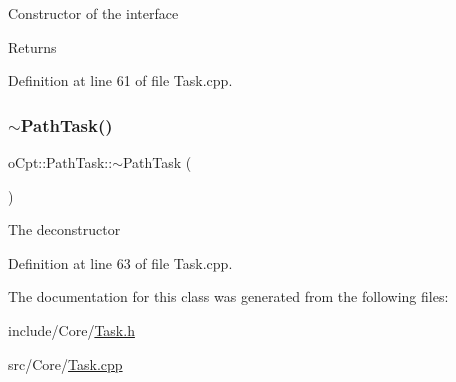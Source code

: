 Constructor of the interface \begin{DoxyReturn}{Returns}

\end{DoxyReturn}


Definition at line 61 of file Task.\+cpp.

\hypertarget{classo_cpt_1_1_path_task_a957810982a8f94b7c0b942e348e86467}{}\label{classo_cpt_1_1_path_task_a957810982a8f94b7c0b942e348e86467} 
\subsubsection{\texorpdfstring{$\sim$\+Path\+Task()}{~PathTask()}}
{\footnotesize\ttfamily o\+Cpt\+::\+Path\+Task\+::$\sim$\+Path\+Task (\begin{DoxyParamCaption}{ }\end{DoxyParamCaption})\hspace{0.3cm}{\ttfamily [virtual]}}

The deconstructor 

Definition at line 63 of file Task.\+cpp.



The documentation for this class was generated from the following files\+:\begin{DoxyCompactItemize}
\item 
include/\+Core/\hyperlink{_task_8h}{Task.\+h}\item 
src/\+Core/\hyperlink{_task_8cpp}{Task.\+cpp}\end{DoxyCompactItemize}

